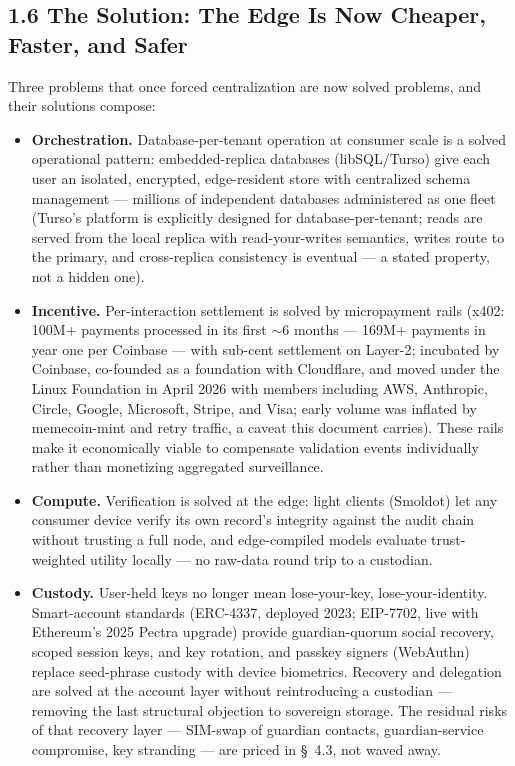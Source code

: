 \documentclass[
]{article}
\begin{document}
\subsection{1.6 The Solution: The Edge Is Now Cheaper, Faster, and
Safer}\label{the-solution-the-edge-is-now-cheaper-faster-and-safer}

Three problems that once forced centralization are now solved problems,
and their solutions compose:

\begin{itemize}
\item
  \textbf{Orchestration.} Database-per-tenant operation at consumer
  scale is a solved operational pattern: embedded-replica databases
  (libSQL/Turso) give each user an isolated, encrypted, edge-resident
  store with centralized schema management --- millions of independent
  databases administered as one fleet (Turso's platform is explicitly
  designed for database-per-tenant; reads are served from the local
  replica with read-your-writes semantics, writes route to the primary,
  and cross-replica consistency is eventual --- a stated property, not a
  hidden one).
\item
  \textbf{Incentive.} Per-interaction settlement is solved by
  micropayment rails (x402: 100M+ payments processed in its first
  \(\sim\)6 months --- 169M+ payments in year one per Coinbase --- with
  sub-cent settlement on Layer-2; incubated by Coinbase, co-founded as a
  foundation with Cloudflare, and moved under the Linux Foundation in
  April 2026 with members including AWS, Anthropic, Circle, Google,
  Microsoft, Stripe, and Visa; early volume was inflated by
  memecoin-mint and retry traffic, a caveat this document carries).
  These rails make it economically viable to compensate validation
  events individually rather than monetizing aggregated surveillance.
\item
  \textbf{Compute.} Verification is solved at the edge: light clients
  (Smoldot) let any consumer device verify its own record's integrity
  against the audit chain without trusting a full node, and
  edge-compiled models evaluate trust-weighted utility locally --- no
  raw-data round trip to a custodian.
\item
  \textbf{Custody.} User-held keys no longer mean lose-your-key,
  lose-your-identity. Smart-account standards (ERC-4337, deployed 2023;
  EIP-7702, live with Ethereum's 2025 Pectra upgrade) provide
  guardian-quorum social recovery, scoped session keys, and key
  rotation, and passkey signers (WebAuthn) replace seed-phrase custody
  with device biometrics. Recovery and delegation are solved at the
  account layer without reintroducing a custodian --- removing the last
  structural objection to sovereign storage. The residual risks of that
  recovery layer --- SIM-swap of guardian contacts, guardian-service
  compromise, key stranding --- are priced in §~4.3, not waved away.
\end{itemize}
\end{document}
